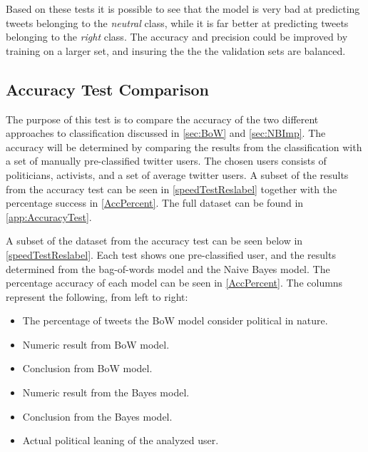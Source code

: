 Based on these tests it is possible to see that the model is very bad at
predicting tweets belonging to the \textit{neutral} class, while it is far
better at predicting tweets belonging to the \textit{right} class. The accuracy
and precision could be improved by training on a larger set, and insuring the
the the validation sets are balanced.

\subsection{Accuracy Test Comparison}
The purpose of this test is to compare the accuracy of the two different
approaches to classification discussed in \autoref{sec:BoW} and
\autoref{sec:NBImp}. The accuracy will be determined by comparing the results
from the classification with a set of manually pre-classified twitter users.
The chosen users consists of politicians, activists, and a set of average
twitter users. A subset of the results from the accuracy test can be seen in
\autoref{speedTestReslabel} together with the percentage success in
\autoref{AccPercent}. The full dataset can be found in
\autoref{app:AccuracyTest}.\nl

A subset of the dataset from the accuracy test can be seen below in
\autoref{speedTestReslabel}. Each test shows one pre-classified user, and the
results determined from the bag-of-words model and the Naive Bayes model. The percentage accuracy
of each model can be seen in \autoref{AccPercent}.
The columns represent the following, from left to right:\nl

\begin{itemize}
  \item The percentage of tweets the BoW model
consider political in nature.
\item Numeric result from BoW model.
\item Conclusion from BoW model.
\item Numeric result from the Bayes model.
\item Conclusion from the Bayes model.
\item Actual political leaning of the analyzed user.
\end{itemize}

